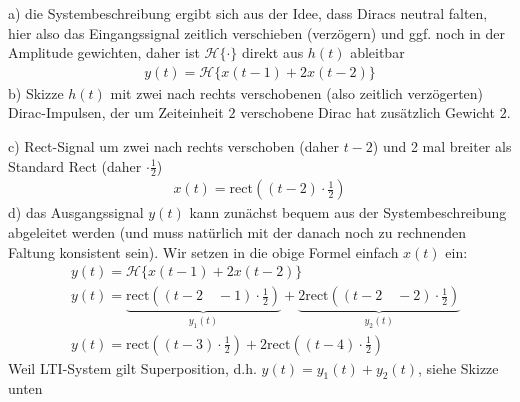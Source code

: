 \begin{Loesung}
a)
die Systembeschreibung ergibt sich aus der Idee, dass Diracs neutral falten,
hier also das Eingangssignal zeitlich verschieben (verzögern) und ggf. noch in der
Amplitude gewichten, daher ist $\mathcal{H}\{\cdot\}$ direkt aus $h(t)$ ableitbar
\begin{align}
y(t) = \mathcal{H}\{x(t-1) + 2 x(t-2)\}
\end{align}
b) Skizze $h(t)$ mit zwei nach rechts verschobenen (also zeitlich verzögerten) Dirac-Impulsen, der um Zeiteinheit $2$ verschobene Dirac hat zusätzlich Gewicht $2$.
\begin{center}
\end{center}
c) Rect-Signal um zwei nach rechts verschoben (daher $t-2$) und 2 mal breiter als Standard Rect (daher $\cdot \frac{1}{2}$)
\begin{align}
x(t) = \text{rect}\left((t-2) \cdot \frac{1}{2}\right)
\end{align}
d) das Ausgangssignal $y(t)$ kann zunächst bequem aus der Systembeschreibung abgeleitet werden (und muss natürlich mit der danach noch zu rechnenden Faltung konsistent sein).
Wir setzen in die obige Formel einfach $x(t)$ ein:
\begin{align}
&y(t) = \mathcal{H}\{x(t-1) + 2 x(t-2)\}\\
&y(t) =
\underbrace{\text{rect}\left((t-2 \quad - 1) \cdot \frac{1}{2}\right)}_{y_1(t)}  +
\underbrace{2 \text{rect}\left((t-2 \quad - 2) \cdot \frac{1}{2}\right)}_{y_2(t)}\\
&y(t) =
\text{rect}\left((t-3) \cdot \frac{1}{2}\right) +
2 \text{rect}\left((t-4) \cdot \frac{1}{2}\right)
\end{align}
Weil LTI-System gilt Superposition, d.h. $y(t)=y_1(t)+y_2(t)$, siehe Skizze unten
\end{Loesung}


